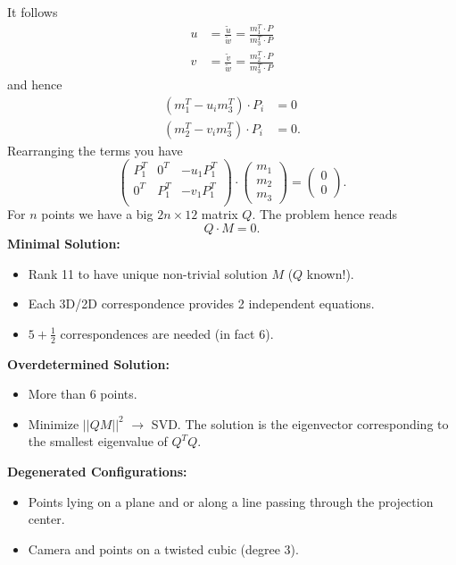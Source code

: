 \documentclass[a4paper,12 pt]{article}
\theoremstyle{definition}
\theoremstyle{remark}
\theoremstyle{definition}
\theoremstyle{definition}
\theoremstyle{definition}
\theoremstyle{remark}
\theoremstyle{definition}
\begin{document}
It follows
\begin{equation}
\begin{split}
u&=\frac{\tilde{u}}{\tilde{w}}=\frac{m_1^T\cdot P}{m_3^T\cdot P}\\
v&=\frac{\tilde{v}}{\tilde{w}}=\frac{m_2^T\cdot P}{m_3^T\cdot P}
\end{split}
\end{equation}
and hence
\begin{equation}
\begin{split}
(m_1^T-u_im_3^T)\cdot P_i&=0\\
(m_2^T-v_im_3^T)\cdot P_i&=0.
\end{split}
\end{equation}
Rearranging the terms you have
\begin{equation}
\begin{pmatrix}
P_1^T &0^T&-u_1P_1^T\\
0^T&P_1^T&-v_1P_1^T\\
\end{pmatrix}\cdot \begin{pmatrix}
 m_1\\
 m_2\\
 m_3
 \end{pmatrix}=\begin{pmatrix}
0\\
0
\end{pmatrix}.
\end{equation}
For $n$ points we have a big $2n \times 12$ matrix $Q$. The problem hence reads
\begin{equation}
Q\cdot M=0.
\end{equation}
\textbf{Minimal Solution:}
\begin{itemize}
\item Rank 11 to have unique non-trivial solution $M$ ($Q$ known!).
\item Each 3D/2D correspondence provides 2 independent equations.
\item $5+\frac{1}{2}$ correspondences are needed (in fact 6).
\end{itemize}
\textbf{Overdetermined Solution:}
\begin{itemize}
\item More than 6 points.
\item Minimize $||QM||^2$ $\rightarrow$ SVD. The solution is the eigenvector corresponding to the smallest eigenvalue of $Q^TQ$.
\end{itemize}
\textbf{Degenerated Configurations:}
\begin{itemize}
\item Points lying on a plane and or along a line passing through the projection center.
\item Camera and points on a twisted cubic (degree 3).
\end{itemize}
\end{document}

